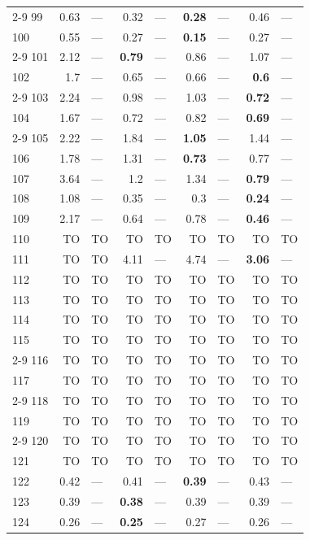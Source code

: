 \begin{longtable}{lr@{\hskip 4pt}l@{\hskip 12pt}r@{\hskip 4pt}l@{\hskip 12pt}r@{\hskip 4pt}l@{\hskip 12pt}r@{\hskip 4pt}l@{\hskip 12pt}}
\cmidrule{2-9}
99 & 0.63 & --- & 0.32 & --- & \textbf{0.28} & --- & 0.46 & --- \\
100 & 0.55 & --- & 0.27 & --- & \textbf{0.15} & --- & 0.27 & --- \\
\cmidrule{2-9}
101 & 2.12 & --- & \textbf{0.79} & --- & 0.86 & --- & 1.07 & --- \\
102 & 1.7 & --- & 0.65 & --- & 0.66 & --- & \textbf{0.6} & --- \\
\cmidrule{2-9}
103 & 2.24 & --- & 0.98 & --- & 1.03 & --- & \textbf{0.72} & --- \\
104 & 1.67 & --- & 0.72 & --- & 0.82 & --- & \textbf{0.69} & --- \\
\cmidrule{2-9}
105 & 2.22 & --- & 1.84 & --- & \textbf{1.05} & --- & 1.44 & --- \\
106 & 1.78 & --- & 1.31 & --- & \textbf{0.73} & --- & 0.77 & --- \\
\midrule
107 & 3.64 & --- & 1.2 & --- & 1.34 & --- & \textbf{0.79} & --- \\
108 & 1.08 & --- & 0.35 & --- & 0.3 & --- & \textbf{0.24} & --- \\
109 & 2.17 & --- & 0.64 & --- & 0.78 & --- & \textbf{0.46} & --- \\
110 & TO & TO & TO & TO & TO & TO & TO & TO \\
111 & TO & TO & 4.11 & --- & 4.74 & --- & \textbf{3.06} & --- \\
112 & TO & TO & TO & TO & TO & TO & TO & TO \\
113 & TO & TO & TO & TO & TO & TO & TO & TO \\
114 & TO & TO & TO & TO & TO & TO & TO & TO \\
115 & TO & TO & TO & TO & TO & TO & TO & TO \\
\cmidrule{2-9}
116 & TO & TO & TO & TO & TO & TO & TO & TO \\
117 & TO & TO & TO & TO & TO & TO & TO & TO \\
\cmidrule{2-9}
118 & TO & TO & TO & TO & TO & TO & TO & TO \\
119 & TO & TO & TO & TO & TO & TO & TO & TO \\
\cmidrule{2-9}
120 & TO & TO & TO & TO & TO & TO & TO & TO \\
121 & TO & TO & TO & TO & TO & TO & TO & TO \\
\midrule
122 & 0.42 & --- & 0.41 & --- & \textbf{0.39} & --- & 0.43 & --- \\
123 & 0.39 & --- & \textbf{0.38} & --- & 0.39 & --- & 0.39 & --- \\
124 & 0.26 & --- & \textbf{0.25} & --- & 0.27 & --- & 0.26 & --- \\

\end{longtable}

